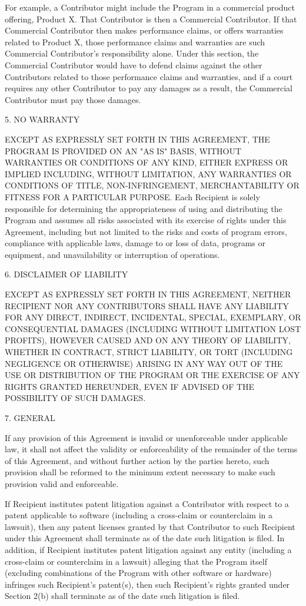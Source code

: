 \begin{small}
For example, a Contributor might include the Program in a commercial product
offering, Product X. That Contributor is then a Commercial Contributor. If that
Commercial Contributor then makes performance claims, or offers warranties
related to Product X, those performance claims and warranties are such
Commercial Contributor's responsibility alone. Under this section, the
Commercial Contributor would have to defend claims against the other
Contributors related to those performance claims and warranties, and if a court
requires any other Contributor to pay any damages as a result, the Commercial
Contributor must pay those damages.


5. NO WARRANTY

EXCEPT AS EXPRESSLY SET FORTH IN THIS AGREEMENT, THE PROGRAM IS PROVIDED ON AN
"AS IS" BASIS, WITHOUT WARRANTIES OR CONDITIONS OF ANY KIND, EITHER EXPRESS OR
IMPLIED INCLUDING, WITHOUT LIMITATION, ANY WARRANTIES OR CONDITIONS OF TITLE,
NON-INFRINGEMENT, MERCHANTABILITY OR FITNESS FOR A PARTICULAR PURPOSE. Each
Recipient is solely responsible for determining the appropriateness of using and
distributing the Program and assumes all risks associated with its exercise of
rights under this Agreement, including but not limited to the risks and costs of
program errors, compliance with applicable laws, damage to or loss of data,
programs or equipment, and unavailability or interruption of operations.


6. DISCLAIMER OF LIABILITY

EXCEPT AS EXPRESSLY SET FORTH IN THIS AGREEMENT, NEITHER RECIPIENT NOR ANY
CONTRIBUTORS SHALL HAVE ANY LIABILITY FOR ANY DIRECT, INDIRECT, INCIDENTAL,
SPECIAL, EXEMPLARY, OR CONSEQUENTIAL DAMAGES (INCLUDING WITHOUT LIMITATION LOST
PROFITS), HOWEVER CAUSED AND ON ANY THEORY OF LIABILITY, WHETHER IN CONTRACT,
STRICT LIABILITY, OR TORT (INCLUDING NEGLIGENCE OR OTHERWISE) ARISING IN ANY WAY
OUT OF THE USE OR DISTRIBUTION OF THE PROGRAM OR THE EXERCISE OF ANY RIGHTS
GRANTED HEREUNDER, EVEN IF ADVISED OF THE POSSIBILITY OF SUCH DAMAGES.


7. GENERAL

If any provision of this Agreement is invalid or unenforceable under applicable
law, it shall not affect the validity or enforceability of the remainder of the
terms of this Agreement, and without further action by the parties hereto, such
provision shall be reformed to the minimum extent necessary to make such
provision valid and enforceable.

If Recipient institutes patent litigation against a Contributor with respect to
a patent applicable to software (including a cross-claim or counterclaim in a
lawsuit), then any patent licenses granted by that Contributor to such Recipient
under this Agreement shall terminate as of the date such litigation is filed. In
addition, if Recipient institutes patent litigation against any entity
(including a cross-claim or counterclaim in a lawsuit) alleging that the Program
itself (excluding combinations of the Program with other software or hardware)
infringes such Recipient's patent(s), then such Recipient's rights granted under
Section 2(b) shall terminate as of the date such litigation is filed.


\end{small}
